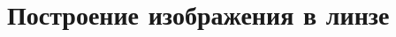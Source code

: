 \documentclass[main.tex]{subfiles}
\begin{document}

 

 

 
   

\section{Построение изображения в линзе}


%











\end{document}
